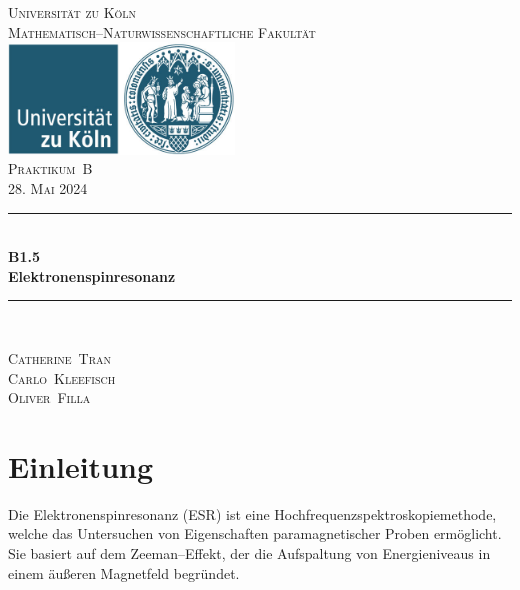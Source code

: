\documentclass[12pt,a4paper]{scrartcl}
\numberwithin{equation}{section} %
\newcommand{\HRule}{\rule{\linewidth}{0.7mm}}
\begin{document}
\begin{titlepage}
	\pagestyle{empty}

	\begin{center}

	\textsc{\LARGE Universität zu Köln }\\ [0.4cm]
	\textsc{Mathematisch--Naturwissenschaftliche Fakultät} \\[1.5cm]

	\includegraphics[width=0.45\textwidth]{../media/uni.jpg} \\[1.5cm]  %

	\textsc{\Large Praktikum~B}\\[2mm]
	\textsc{28. Mai 2024}\\[10mm]
	\HRule \\[0.4cm]

		{	\Huge \bfseries B1.5}\\[0.4cm]
			{	\huge \bfseries Elektronenspinresonanz}\\[0.3cm]
	
	\HRule \\[3cm]

 	\begin{center}
		\textsc{\Large Catherine~Tran } \\[3pt]
		\textsc{\Large Carlo~Kleefisch } \\[3pt]
		\textsc{\Large Oliver~Filla } \\[3pt]
	\end{center}
	\end{center}
\end{titlepage}

\newpage
\tableofcontents
\newpage

\clearpage
\hypertarget{einleitung}{%
\section{Einleitung}\label{einleitung}}

Die Elektronenspinresonanz (ESR) ist eine
Hochfrequenzspektroskopiemethode, welche das Untersuchen von
Eigenschaften paramagnetischer Proben ermöglicht. Sie basiert auf dem
Zeeman--Effekt, der die Aufspaltung von Energieniveaus in einem äußeren
Magnetfeld begründet.
\end{document}
